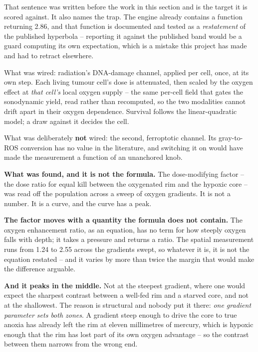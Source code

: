 \documentclass[11pt,twoside,openright]{report}
\begin{document}

That sentence was written before the work in this section and is the target it is scored against. It also names the trap. The engine already contains a function returning 2.86, and that function is documented and tested as a \textit{restatement} of the published hyperbola -- reporting it against the published band would be a guard computing its own expectation, which is a mistake this project has made and had to retract elsewhere.

\begin{numbers}
What was wired: radiation's DNA-damage channel, applied per cell, once, at its own step. Each living tumour cell's dose is attenuated, then scaled by the oxygen effect at \textit{that cell's} local oxygen supply -- the same per-cell field that gates the sonodynamic yield, read rather than recomputed, so the two modalities cannot drift apart in their oxygen dependence. Survival follows the linear-quadratic model; a draw against it decides the cell.

What was deliberately \textbf{not} wired: the second, ferroptotic channel. Its gray-to-ROS conversion has no value in the literature, and switching it on would have made the measurement a function of an unanchored knob.
\end{numbers}

\textbf{What was found, and it is not the formula.} The dose-modifying factor -- the dose ratio for equal kill between the oxygenated rim and the hypoxic core -- was read off the population across a sweep of oxygen gradients. It is not a number. It is a curve, and the curve has a peak.

\begin{numbers}







\end{numbers}

\begin{finding}
\textbf{The factor moves with a quantity the formula does not contain.} The oxygen enhancement ratio, as an equation, has no term for how steeply oxygen falls with depth; it takes a pressure and returns a ratio. The spatial measurement runs from 1.24 to 2.55 across the gradients swept, so whatever it is, it is not the equation restated -- and it varies by more than twice the margin that would make the difference arguable.

\textbf{And it peaks in the middle.} Not at the steepest gradient, where one would expect the sharpest contrast between a well-fed rim and a starved core, and not at the shallowest. The reason is structural and nobody put it there: \textit{one gradient parameter sets both zones}. A gradient steep enough to drive the core to true anoxia has already left the rim at eleven millimetres of mercury, which is hypoxic enough that the rim has lost part of its own oxygen advantage -- so the contrast between them narrows from the wrong end.
\end{finding}
\end{document}
